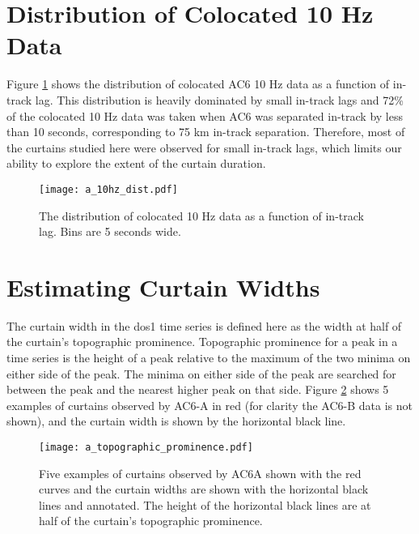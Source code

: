 \documentclass[draft]{agujournal2019}
\begin{document}
\appendix

\section{Distribution of Colocated 10 Hz Data}
Figure \ref{a_10Hz_dist} shows the distribution of colocated AC6 10 Hz data as a function of in-track lag. This distribution is heavily dominated by small in-track lags and 72\% of the colocated 10 Hz data was taken when AC6 was separated in-track by less than 10 seconds, corresponding to 75 km in-track separation. Therefore, most of the curtains studied here were observed for small in-track lags, which limits our ability to explore the extent of the curtain duration.

\begin{figure}
\texttt{[image: a\_10hz\_dist.pdf]}
\caption{The distribution of colocated 10 Hz data as a function of in-track lag. Bins are 5 seconds wide.}
\label{a_10Hz_dist}
\end{figure}

\section{Estimating Curtain Widths} \label{appendix_b}
The curtain width in the dos1 time series is defined here as the width at half of the curtain's topographic prominence. Topographic prominence for a peak in a time series is the height of a peak relative to the maximum of the two minima on either side of the peak. The minima on either side of the peak are searched for between the peak and the nearest higher peak on that side. Figure \ref{a_topographic_prominence} shows 5 examples of curtains observed by AC6-A in red (for clarity the AC6-B data is not shown), and the curtain width is shown by the horizontal black line.

\begin{figure}
\texttt{[image: a\_topographic\_prominence.pdf]}
\caption{Five examples of curtains observed by AC6A shown with the red curves and the curtain widths are shown with the horizontal black lines and annotated. The height of the horizontal black lines are at half of the curtain's topographic prominence.}
\label{a_topographic_prominence}
\end{figure}
\end{document}
